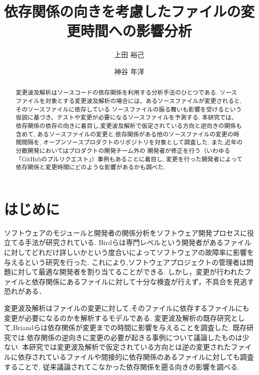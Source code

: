 \documentclass{fose2016}           %
\title{依存関係の向きを考慮したファイルの変更時間への影響分析}
\author{上田 裕己}{Ueda Yuki, 島根大学総合理工学部}
\author{神谷 年洋}{Kamiya Toshihiro, 島根大学総合理工学研究科}
\begin{document}
\maketitle

\begin{abstract}
変更波及解析はソースコードの依存関係を利用する分析手法のひとつである.
ソースファイルを対象とする変更波及解析の場合には、あるソースファイルが変更されると,そのソースファイルに依存している
ソースファイルの振る舞いも影響を受けるという仮説に基づき、テストや変更が必要になるソースファイルを予測する.
本研究では、依存関係の依存の向きに着目し,変更波及解析で仮定されている方向と逆向きの関係も含めて,
あるソースファイルの変更と,依存関係がある他のソースファイルの変更の時間間隔を,
オープンソースプロダクトのリポジトリを対象として調査した.
また,近年の分散開発においてはプロダクトの開発チーム外の
開発者が修正を行う（いわゆる「GitHubのプルリクエスト」）事例もあることに着目し,
変更を行った開発者によって依存関係と変更時間にどのような影響があるかも調べた.

\end{abstract}



\section{はじめに} 
ソフトウェアのモジュールと開発者の関係分析をソフトウェア開発プロセスに役立てる手法が研究されている\cite{Bird,Patanamon}.
Bird\cite{Bird}らは専門レベルという開発者があるファイルに対してどれだけ詳しいかという度合いによってソフトウェアの故障率に影響を与えるという研究を行った.
これにより,ソフトウェアプロジェクトの管理者は問題に対して最適な開発者を割り当てることができる.
しかし，変更が行われたファイルと依存関係にあるファイルに対して十分な検査が行えず，不具合を見逃す恐れがある．

変更波及解析はファイルの変更に対して,そのファイルに依存するファイルにも変更が必要になるのかを解析するモデルである.
変更波及解析の既存研究として,Briand\cite{Briand}らは依存関係が変更までの時間に影響を与えることを調査した.
既存研究では.依存関係の逆向きに変更の必要が起きる事例について議論したものは少ない\cite{Omori}.
本研究では変更波及解析で仮定されている方向とは逆の変更されたファイルに依存されているファイルや間接的に依存関係のあるファイルに対しても調査することで,
従来議論されてこなかった依存関係を遡る向きの影響を調べる.
\end{document}
